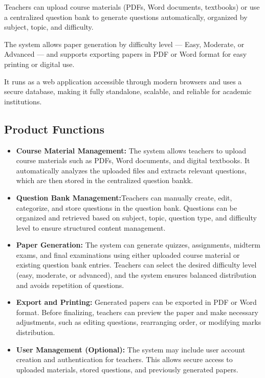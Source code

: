 \documentclass[12pt]{article}
\begin{document}
	Teachers can upload course materials (PDFs, Word documents, textbooks) or use a centralized question bank to generate questions automatically, organized by subject, topic, and difficulty.
	
	The system allows paper generation by difficulty level — Easy, Moderate, or Advanced — and supports exporting papers in PDF or Word format for easy printing or digital use.
	
	It runs as a web application accessible through modern browsers and uses a secure database, making it fully standalone, scalable, and reliable for academic institutions.

	\subsection{Product Functions}
	\begin{itemize}
		\item \textbf{Course Material Management:}
		The system allows teachers to upload course materials such as PDFs, Word documents, and digital textbooks. It automatically analyzes the uploaded files and extracts relevant questions, which are then stored in the centralized question bankk.
		\item \textbf{Question Bank Management:}Teachers can manually create, edit, categorize, and store questions in the question bank. Questions can be organized and retrieved based on subject, topic, question type, and difficulty level to ensure structured content management.
		\item \textbf{Paper Generation:} The system can generate quizzes, assignments, midterm exams, and final examinations using either uploaded course material or existing question bank entries. Teachers can select the desired difficulty level (easy, moderate, or advanced), and the system ensures balanced distribution and avoids repetition of questions.
		\item \textbf{Export and Printing:} Generated papers can be exported in PDF or Word format. Before finalizing, teachers can preview the paper and make necessary adjustments, such as editing questions, rearranging order, or modifying marks distribution.
		\item \textbf{User Management (Optional):} The system may include user account creation and authentication for teachers. This allows secure access to uploaded materials, stored questions, and previously generated papers.
	\end{itemize}
	
\end{document}
